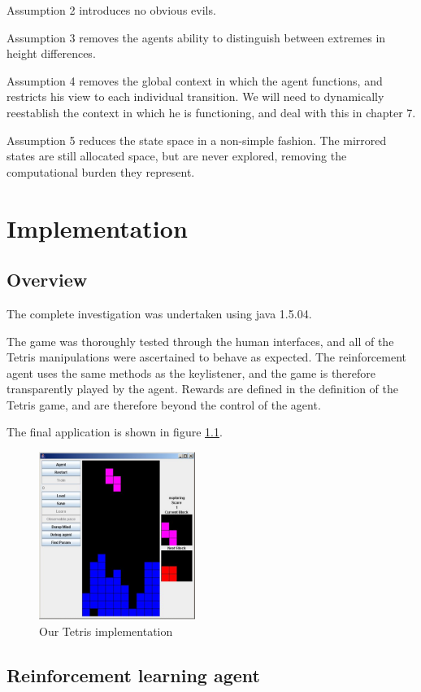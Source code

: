 \documentclass{rucsthesis}
\begin{document}
Assumption 2 introduces no obvious evils.

Assumption 3 removes the agents ability to distinguish between extremes in height differences.

Assumption 4 removes the global context in which the agent functions, and restricts his view to each individual transition. We will need to dynamically reestablish the context in which he is functioning, and deal with this in chapter 7.

Assumption 5 reduces the state space in a non-simple fashion. The mirrored states are still allocated space, but are never explored, removing the computational burden they represent. 

\chapter{Implementation}

\section{Overview}

The complete investigation was undertaken using java 1.5.04.

The game was thoroughly tested through the human interfaces, and all of the Tetris manipulations were ascertained to behave as expected. The reinforcement agent uses the same methods as the keylistener, and the game is therefore transparently played by the agent. Rewards are defined in the definition of the Tetris game, and are therefore beyond the control of the agent.

The final application is shown in figure \ref{fig:mytetris}.

\begin{figure}[h]
\centering
\includegraphics[width=2in]{mytetris.png}
\caption{Our Tetris implementation}
\label{fig:mytetris}
\end{figure}

\section{Reinforcement learning agent}
\end{document}
